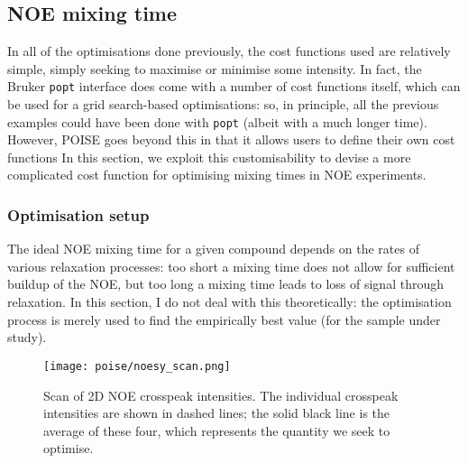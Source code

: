 \subsection{NOE mixing time}
\label{subsec:poise__noe}

In all of the optimisations done previously, the cost functions used are relatively simple, simply seeking to maximise or minimise some intensity.
In fact, the Bruker \texttt{popt} interface does come with a number of cost functions itself, which can be used for a grid search-based optimisations: so, in principle, all the previous examples could have been done with \texttt{popt} (albeit with a much longer time).
However, POISE goes beyond this in that it allows users to define their own cost functions
In this section, we exploit this customisability to devise a more complicated cost function for optimising mixing times in NOE experiments.

\subsubsection{Optimisation setup}

The ideal NOE mixing time for a given compound depends on the rates of various relaxation processes: too short a mixing time does not allow for sufficient buildup of the NOE, but too long a mixing time leads to loss of signal through relaxation.
In this section, I do not deal with this theoretically: the optimisation process is merely used to find the empirically best value (for the sample under study).

\begin{figure}[htb]
    \centering
    \texttt{[image: poise/noesy\_scan.png]}
    \caption[Scan of 2D NOE crosspeak intensities]{
        Scan of 2D NOE crosspeak intensities.
        The individual crosspeak intensities are shown in dashed lines; the solid black line is the average of these four, which represents the quantity we seek to optimise.
    }
    \label{fig:poise_noesy_scan}
\end{figure}

